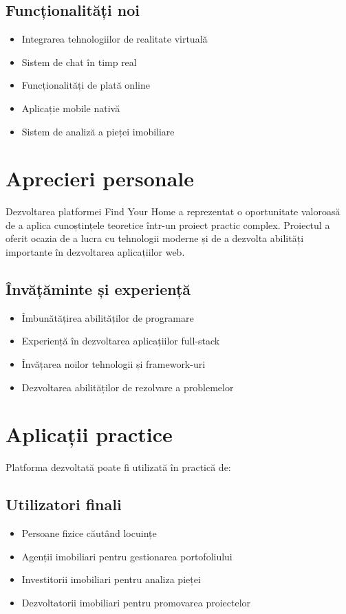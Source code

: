 \documentclass[12pt,a4paper]{report}
\begin{document}
\subsection{Funcționalități noi}
\begin{itemize}
    \item Integrarea tehnologiilor de realitate virtuală
    \item Sistem de chat în timp real
    \item Funcționalități de plată online
    \item Aplicație mobile nativă
    \item Sistem de analiză a pieței imobiliare
\end{itemize}

\section{Aprecieri personale}
Dezvoltarea platformei Find Your Home a reprezentat o oportunitate valoroasă de a aplica cunoștințele teoretice într-un proiect practic complex. Proiectul a oferit ocazia de a lucra cu tehnologii moderne și de a dezvolta abilități importante în dezvoltarea aplicațiilor web.

\subsection{Învățăminte și experiență}
\begin{itemize}
    \item Îmbunătățirea abilităților de programare
    \item Experiență în dezvoltarea aplicațiilor full-stack
    \item Învățarea noilor tehnologii și framework-uri
    \item Dezvoltarea abilităților de rezolvare a problemelor
\end{itemize}

\section{Aplicații practice}
Platforma dezvoltată poate fi utilizată în practică de:

\subsection{Utilizatori finali}
\begin{itemize}
    \item Persoane fizice căutând locuințe
    \item Agenții imobiliari pentru gestionarea portofoliului
    \item Investitorii imobiliari pentru analiza pieței
    \item Dezvoltatorii imobiliari pentru promovarea proiectelor
\end{itemize}
\end{document}
